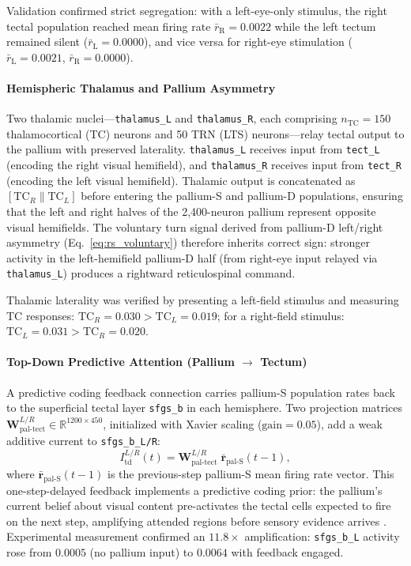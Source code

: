 \documentclass[12pt]{article}
\begin{document}
Validation confirmed strict segregation: with a left-eye-only stimulus,
the right tectal population reached mean firing rate $\bar{r}_\text{R} =
0.0022$ while the left tectum remained silent ($\bar{r}_\text{L} = 0.0000$),
and vice versa for right-eye stimulation
($\bar{r}_\text{L} = 0.0021$, $\bar{r}_\text{R} = 0.0000$).

\paragraph{Hemispheric Thalamus and Pallium Asymmetry}

Two thalamic nuclei---\texttt{thalamus\_L} and \texttt{thalamus\_R},
each comprising $n_\text{TC} = 150$ thalamocortical (TC) neurons and
50 TRN (LTS) neurons---relay tectal output to the pallium with preserved
laterality.
\texttt{thalamus\_L} receives input from \texttt{tect\_L} (encoding the
right visual hemifield), and \texttt{thalamus\_R} receives input from
\texttt{tect\_R} (encoding the left visual hemifield).
Thalamic output is concatenated as $[\text{TC}_R \| \text{TC}_L]$ before
entering the pallium-S and pallium-D populations, ensuring that the left
and right halves of the 2,400-neuron pallium represent opposite visual
hemifields.
The voluntary turn signal derived from pallium-D left/right asymmetry
(Eq.~\ref{eq:rs_voluntary}) therefore inherits correct sign:
stronger activity in the left-hemifield pallium-D half
(from right-eye input relayed via \texttt{thalamus\_L}) produces a
rightward reticulospinal command.

Thalamic laterality was verified by presenting a left-field stimulus
and measuring TC responses: $\text{TC}_R = 0.030 > \text{TC}_L = 0.019$;
for a right-field stimulus: $\text{TC}_L = 0.031 > \text{TC}_R = 0.020$.

\paragraph{Top-Down Predictive Attention (Pallium $\to$ Tectum)}

A predictive coding feedback connection carries pallium-S population
rates back to the superficial tectal layer \texttt{sfgs\_b} in each
hemisphere.
Two projection matrices $\mathbf{W}_\text{pal-tect}^{L/R}
\in \mathbb{R}^{1200 \times 450}$, initialized with Xavier scaling
($\text{gain} = 0.05$), add a weak additive current to \texttt{sfgs\_b\_L/R}:
\begin{equation}\label{eq:topdown}
  I_\text{td}^{L/R}(t) = \mathbf{W}_\text{pal-tect}^{L/R}\;
    \bar{\mathbf{r}}_\text{pal-S}(t{-}1),
\end{equation}
where $\bar{\mathbf{r}}_\text{pal-S}(t{-}1)$ is the previous-step
pallium-S mean firing rate vector.
This one-step-delayed feedback implements a predictive coding prior:
the pallium's current belief about visual content pre-activates the
tectal cells expected to fire on the next step, amplifying attended
regions before sensory evidence arrives \citep{rao1999,clark2013}.
Experimental measurement confirmed an $11.8\times$ amplification:
\texttt{sfgs\_b\_L} activity rose from $0.0005$ (no pallium input) to
$0.0064$ with feedback engaged.
\end{document}
